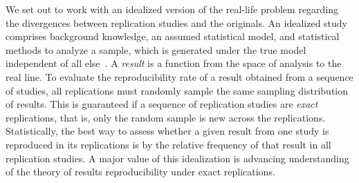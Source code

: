 \documentclass[meta,authordate,issue]{jote-new-article}
\newcounter{result}
\begin{document}
We set out to work with an idealized version of the real-life problem regarding the divergences between replication studies and the originals. An idealized study comprises background knowledge, an assumed statistical model, and statistical methods to analyze a sample, which is  generated under the true model independent of all else~\parencite{Devezer2021}. A {\em result} is a function from the space of analysis to the real line. To evaluate the reproducibility rate of a result obtained from a sequence of studies, all replications must randomly sample the same sampling distribution of results. This is guaranteed if a sequence of replication studies are {\em exact} replications, that is, only the random sample is new across the replications. Statistically, the best way to assess whether a given result from one study is reproduced in its replications is by the relative frequency of that result in all replication studies. A major value of this idealization is advancing understanding of the theory of results reproducibility under exact replications.
\end{document}
